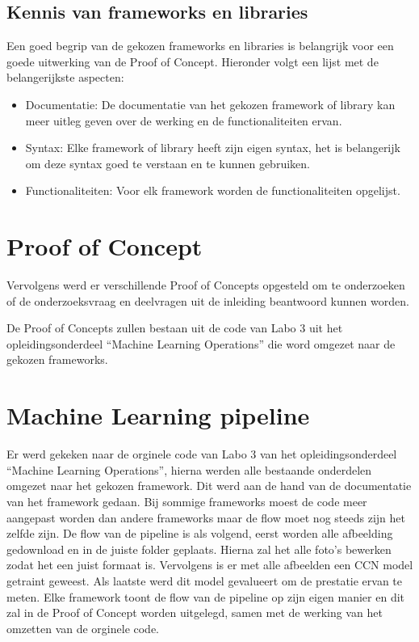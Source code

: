 \subsection{Kennis van frameworks en libraries}
Een goed begrip van de gekozen frameworks en libraries is belangrijk voor een goede uitwerking van de Proof of Concept. Hieronder volgt een lijst met de belangerijkste aspecten:
\begin{itemize}
  \item Documentatie: De documentatie van het gekozen framework of library kan meer uitleg geven over de werking en de functionaliteiten ervan.
  \item Syntax: Elke framework of library heeft zijn eigen syntax, het is belangerijk om deze syntax goed te verstaan en te kunnen gebruiken.
  \item Functionaliteiten: Voor elk framework worden de functionaliteiten opgelijst.
\end{itemize}
\section{Proof of Concept}
Vervolgens werd er verschillende Proof of Concepts opgesteld om te onderzoeken of de onderzoeksvraag en deelvragen uit de inleiding beantwoord kunnen worden.

De Proof of Concepts zullen bestaan uit de code van Labo 3 uit het opleidingsonderdeel ``Machine Learning Operations'' die word omgezet naar de gekozen frameworks.
\section{Machine Learning pipeline}
Er werd gekeken naar de orginele code van Labo 3 van het opleidingsonderdeel ``Machine Learning Operations'', hierna werden alle bestaande onderdelen omgezet naar het gekozen framework. Dit werd aan de hand van de documentatie van het framework gedaan.
Bij sommige frameworks moest de code meer aangepast worden dan andere frameworks maar de flow moet nog steeds zijn het zelfde zijn.
De flow van de pipeline is als volgend, eerst worden alle afbeelding gedownload en in de juiste folder geplaats. Hierna zal het alle foto's bewerken zodat het een juist formaat is. Vervolgens is er met alle afbeelden een CCN model getraint geweest. Als laatste werd dit model gevalueert om de prestatie ervan te meten.
Elke framework toont de flow van de pipeline op zijn eigen manier en dit zal in de Proof of Concept worden uitgelegd, samen met de werking van het omzetten van de orginele code.
